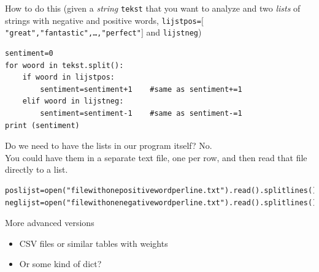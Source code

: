 \documentclass{beamer}
\begin{document}
\begin{frame}[fragile]{How to do this}
\scriptsize{ 
(given a \emph{string} \texttt{tekst} that you want to analyze and two 
\emph{lists} of strings with negative and positive words, 
\texttt{lijstpos=$[$"great","fantastic",\ldots,"perfect"$]$} and \texttt{lijstneg})\\
}

\begin{lstlisting}
sentiment=0
for woord in tekst.split():
    if woord in lijstpos:
        sentiment=sentiment+1    #same as sentiment+=1
    elif woord in lijstneg:
        sentiment=sentiment-1    #same as sentiment-=1
print (sentiment)
\end{lstlisting}
\end{frame}


\begin{frame}[fragile]{Do we need to have the lists in our program itself?}
No.\\
You could have them in a separate text file, one per row, and then read that file directly to a list.\\
\begin{lstlisting}
poslijst=open("filewithonepositivewordperline.txt").read().splitlines()
neglijst=open("filewithonenegativewordperline.txt").read().splitlines()
\end{lstlisting}
\end{frame}


{
\begin{frame}[plain]
\end{frame}
}


\begin{frame}{More advanced versions}
\begin{itemize}
\item CSV files or similar tables with weights
\item Or some kind of dict?
\end{itemize}
\end{frame}

{
\begin{frame}[plain]
\end{frame}
\begin{frame}[plain]
\end{frame}
}
\end{document}

